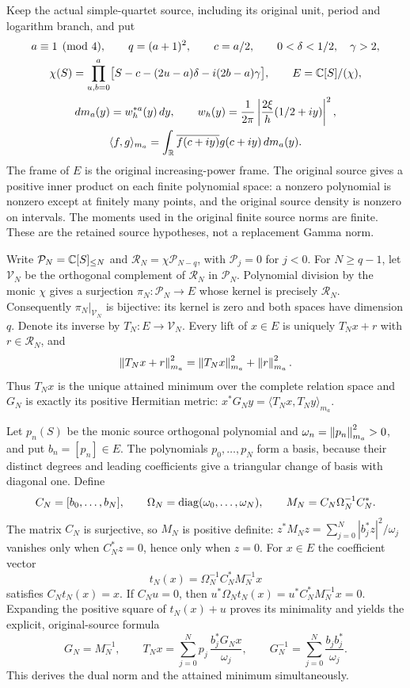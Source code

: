 Keep the actual simple-quartet source, including its original unit,
period and logarithm branch, and put
\begin{equation}\label{a04oid:oid:objects}
\begin{gathered}
a\equiv1\pmod4,\qquad q=(a+1)^2,\qquad c=a/2,\qquad
0<\delta<1/2,\quad\gamma>2,\\
\chi(S)=\prod_{u,b=0}^a
\bigl[S-c-(2u-a)\delta-i(2b-a)\gamma\bigr],\qquad
E=\mathbb C[S]/(\chi),\\
dm_a(y)=w_h^{*a}(y)\,dy,\qquad
w_h(y)=\frac1{2\pi}\left|\frac{2\xi}{h}(1/2+iy)\right|^2,\\
\langle f,g\rangle_{m_a}
=\int_{\mathbb R}\overline{f(c+iy)}g(c+iy)\,dm_a(y).
\end{gathered}
\end{equation}
The frame of $E$ is the original increasing-power frame. The original
source gives a positive inner product on each finite polynomial space:
a nonzero polynomial is nonzero except at finitely many points, and
the original source density is nonzero on intervals. The moments used
in the original finite source norms are finite. These are the retained
source hypotheses, not a replacement Gamma norm.

Write $\mathcal P_N=\mathbb C[S]_{\leq N}$ and
$\mathcal R_N=\chi\mathcal P_{N-q}$, with $\mathcal P_j=0$ for
$j<0$. For $N\geq q-1$, let $\mathcal V_N$ be the orthogonal
complement of $\mathcal R_N$ in $\mathcal P_N$. Polynomial division
by the monic $\chi$ gives a surjection
$\pi_N:\mathcal P_N\to E$ whose kernel is precisely $\mathcal R_N$.
Consequently $\pi_N|_{\mathcal V_N}$ is bijective: its kernel is
zero and both spaces have dimension $q$. Denote its inverse by
$T_N:E\to\mathcal V_N$. Every lift of $x\in E$ is uniquely
$T_Nx+r$ with $r\in\mathcal R_N$, and
\[
 \left\lVert T_Nx+r\right\rVert_{m_a}^2=\left\lVert T_Nx\right\rVert_{m_a}^2+\left\lVert r\right\rVert_{m_a}^2.
\]
Thus $T_Nx$ is the unique attained minimum over the complete relation
space and $G_N$ is exactly its positive Hermitian metric:
$x^*G_Ny=\langle T_Nx,T_Ny\rangle_{m_a}$.

Let $p_n(S)$ be the monic source orthogonal polynomial and
$\omega_n=\left\lVert p_n\right\rVert_{m_a}^2>0$, and put $b_n=[p_n]\in E$.
The polynomials $p_0,\ldots,p_N$ form a basis, because their distinct
degrees and leading coefficients give a triangular change of basis
with diagonal one. Define
\[
 C_N=[b_0,\ldots,b_N],\qquad
 \Omega_N=\operatorname{diag}(\omega_0,\ldots,\omega_N),\qquad
 M_N=C_N\Omega_N^{-1}C_N^*.
\]
The matrix $C_N$ is surjective, so $M_N$ is positive definite:
$z^*M_Nz=\sum_{j=0}^N|b_j^*z|^2/\omega_j$ vanishes only when
$C_N^*z=0$, hence only when $z=0$. For $x\in E$ the coefficient
vector
\[
 t_N(x)=\Omega_N^{-1}C_N^*M_N^{-1}x
\]
satisfies $C_Nt_N(x)=x$. If $C_Nu=0$, then
$u^*\Omega_Nt_N(x)=u^*C_N^*M_N^{-1}x=0$.
Expanding the positive square of $t_N(x)+u$ proves its minimality
and yields the explicit, original-source formula
\begin{equation}\label{a04oid:oid:minimum}
 G_N=M_N^{-1},\qquad
 T_Nx=\sum_{j=0}^N p_j\,
 \frac{b_j^*G_Nx}{\omega_j},\qquad
 G_N^{-1}=\sum_{j=0}^N\frac{b_jb_j^*}{\omega_j}.
\end{equation}
This derives the dual norm and the attained minimum simultaneously.

